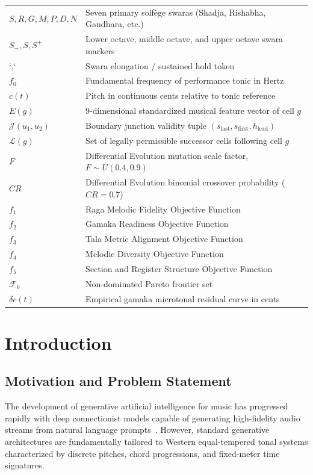 \documentclass[12pt,a4paper]{report}
\begin{document}
\noindent
\begin{tabular}{@{}ll@{}}
$S, R, G, M, P, D, N$ & Seven primary solf{\`e}ge swaras (Shadja, Rishabha, Gandhara, etc.) \\
$S_-, S, S^+$ & Lower octave, middle octave, and upper octave swara markers \\
`,` & Swara elongation / sustained hold token \\
$f_0$ & Fundamental frequency of performance tonic in Hertz \\
$c(t)$ & Pitch in continuous cents relative to tonic reference \\
$E(g)$ & 9-dimensional standardized musical feature vector of cell $g$ \\
$\mathcal{J}(u_1, u_2)$ & Boundary junction validity tuple $(s_{\text{last}}, s_{\text{first}}, h_{\text{lead}})$ \\
$\mathcal{L}(g)$ & Set of legally permissible successor cells following cell $g$ \\
$F$ & Differential Evolution mutation scale factor, $F \sim U(0.4, 0.9)$ \\
$CR$ & Differential Evolution binomial crossover probability ($CR = 0.7$) \\
$f_1$ & Raga Melodic Fidelity Objective Function \\
$f_2$ & Gamaka Readiness Objective Function \\
$f_3$ & Tala Metric Alignment Objective Function \\
$f_4$ & Melodic Diversity Objective Function \\
$f_5$ & Section and Register Structure Objective Function \\
$\mathcal{F}_0$ & Non-dominated Pareto frontier set \\
$\delta c(t)$ & Empirical gamaka microtonal residual curve in cents \\
\end{tabular}

\newpage
{}
\setcounter{page}{1}

\chapter{Introduction}

\section{Motivation and Problem Statement}
The development of generative artificial intelligence for music has progressed rapidly with deep connectionist models capable of generating high-fidelity audio streams from natural language prompts~\cite{copet2023}. However, standard generative architectures are fundamentally tailored to Western equal-tempered tonal systems characterized by discrete pitches, chord progressions, and fixed-meter time signatures. 
\end{document}
